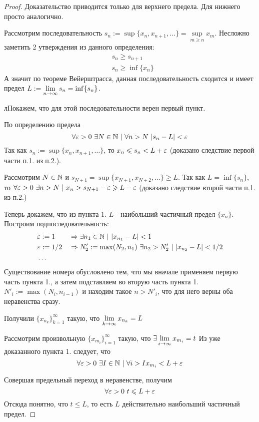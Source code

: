 \begin{proof}
	Доказательство приводится только для верхнего предела. Для нижнего просто аналогично.
	
	Рассмотрим последовательность $s_n := \sup \{x_n, x_{n + 1}, \dots\} = \sup\limits_{m \ge n} x_m$. Несложно заметить 2 утверждения из данного определения:
	\begin{align*}
		&s_n \ge s_{n + 1}
		\\
		&s_n \ge \inf \{x_n\}
	\end{align*}
	А значит по теореме Вейерштрасса, данная последовательность сходится и имеет предел $L := \lim\limits_{n \to \infty} s_n = \inf \{s_n\}$. 
	
	лПокажем, что для этой последовательности верен первый пункт.
	
	По определению предела 
	$$
		\forall \varepsilon > 0\ \exists N \in \mathbb{N}\ |\ \forall n > N\ |s_n - L| < \varepsilon
	$$
	Так как $s_n := \sup \{x_n, x_{n + 1}, \dots\}$, то $x_n \leqslant s_n < L + \varepsilon$ (доказано следствие первой части п.1. из п.2.).
	
	Рассмотрим $N \in \mathbb{N}$ и $s_{N + 1} = \sup \{x_{N + 1}, x_{N + 2}, \dots\} \ge L$. Так как $L = \inf \{s_n\}$, то $\forall \eps > 0\ \exists n > N\ |\ x_n > s_{N + 1} - \eps \ge L - \eps$ (доказано следствие второй части п.1. из п.2.)
	
	Теперь докажем, что из пункта 1. $L$ - наибольший частичный предел $\{x_n\}$. Построим подпоследовательность:
	\begin{align*}
		&\varepsilon := 1 & &\Rightarrow \exists n_1 \in \mathbb{N}\ |\ |x_{n_1} - L| < 1
		\\
		&\varepsilon := 1/2 & &\Rightarrow N'_2 := \max(N_2, n_1)\ \exists n_2 > N'_2\ |\ |x_{n_2} - L| < 1/2
		\\
		&\dots		
	\end{align*}
	Существование номера обусловлено тем, что мы вначале применяем первую часть пункта 1., а затем подставляем во вторую часть пункта 1. $N'_i := \max(N_i, n_{i - 1})$ и находим такое $n > N'_i$, что для него верны оба неравенства сразу.
	
	Получили $\{x_{n_k}\}_{k = 1}^\infty$ такую, что $\lim\limits_{k \to \infty} x_{n_k} = L$
	
	Рассмотрим произвольную $\{x_{m_i}\}_{i = 1}^\infty$ такую, что $\exists \lim\limits_{i \to \infty} x_{m_i} = t$ Из уже доказанного пункта 1. следует, что
	$$
		\forall \varepsilon > 0\ \exists I \in \mathbb{N}\ |\ \forall i > I x_{m_i} < L + \varepsilon
	$$
	
	Совершая предельный переход в неравенстве, получим
	$$
		\forall \varepsilon > 0\ t \leqslant L + \varepsilon
	$$
	Отсюда понятно, что $t \le L$, то есть $L$ действительно наибольший частичный предел.
\end{proof}

